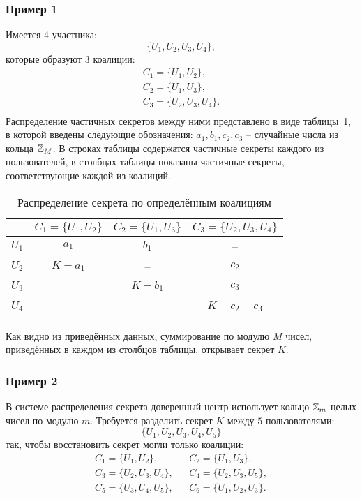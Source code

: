 \subsubsection{Пример 1}

Имеется 4 участника:
    \[ \{ U_1, U_2, U_3, U_4 \}, \]
которые образуют 3 коалиции:
\[ \begin{array}{l}
    C_1 = \{ U_1, U_2 \}, \\
    C_2 = \{ U_1, U_3 \}, \\
    C_3 = \{ U_2, U_3, U_4 \}. \\
\end{array} \]
Распределение частичных секретов между ними представлено в виде таблицы~\ref{tab:secret-share-coalition-1}, в которой введены следующие обозначения: $a_1, b_1, c_2, c_3$ -- случайные числа из кольца $\mathbb{Z}_M$. В строках таблицы содержатся частичные секреты каждого из пользователей, в столбцах таблицы показаны частичные секреты, соответствующие каждой из коалиций.

\begin{table}[!ht]
    \centering
    \caption{Распределение секрета по определённым коалициям\label{tab:secret-share-coalition-1}}
    \begin{tabular}{|c||c|c|c|}
        \hline
              & $C_1 = \{ U_1, U_2 \}$ & $C_2 = \{U_1, U_3 \}$ & $C_3 = \{ U_2, U_3, U_4 \}$ \\
        \hline \hline
        $U_1$ & $a_1$     & $b_1$     & -- \\
        $U_2$ & $K - a_1$ & --        & $c_2$ \\
        $U_3$ & --        & $K - b_1$ & $c_3$  \\
        $U_4$ & --        & --        & $K - c_2 - c_3$ \\
        \hline
    \end{tabular}
\end{table}

Как видно из приведённых данных, суммирование по модулю $M$ чисел, приведённых в каждом из столбцов таблицы, открывает секрет $K$.


\subsubsection{Пример 2}

В системе распределения секрета доверенный
центр использует кольцо $\mathbb{Z}_m$ целых чисел по модулю $m$. Требуется разделить секрет $K$ между $5$ пользователями:
    \[ \{ U_1, U_2, U_3, U_4, U_5 \} \]
так, чтобы восстановить секрет могли только коалиции:
\[ \begin{array}{lll}
    C_1 = \{ U_1, U_2 \},      & & C_2 = \{ U_1, U_3 \}, \\
    C_3 = \{ U_2, U_3, U_4 \}, & & C_4 = \{ U_2, U_3, U_5 \}, \\
    C_5 = \{ U_3, U_4, U_5 \}, & & C_6 = \{ U_1, U_2, U_3 \}. \\
\end{array} \]

